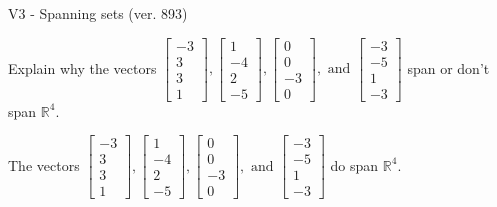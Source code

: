 \begin{exercise}
  \begin{exerciseTitle}V3 - Spanning sets (ver. 893)\end{exerciseTitle}
  \begin{exerciseStatement}
    Explain why the vectors \(\left[\begin{array}{r}
-3 \\
3 \\
3 \\
1
\end{array}\right] , \left[\begin{array}{r}
1 \\
-4 \\
2 \\
-5
\end{array}\right] , \left[\begin{array}{r}
0 \\
0 \\
-3 \\
0
\end{array}\right] , \text{ and } \left[\begin{array}{r}
-3 \\
-5 \\
1 \\
-3
\end{array}\right]\) span or don't span \(\mathbb{R}^4\). 
	


  \end{exerciseStatement}
  \begin{exerciseAnswer}
   The vectors \(\left[\begin{array}{r}
-3 \\
3 \\
3 \\
1
\end{array}\right] , \left[\begin{array}{r}
1 \\
-4 \\
2 \\
-5
\end{array}\right] , \left[\begin{array}{r}
0 \\
0 \\
-3 \\
0
\end{array}\right] , \text{ and } \left[\begin{array}{r}
-3 \\
-5 \\
1 \\
-3
\end{array}\right]\) 
  	 do  
	span \(\mathbb{R}^4\).
  


  \end{exerciseAnswer}
\end{exercise}